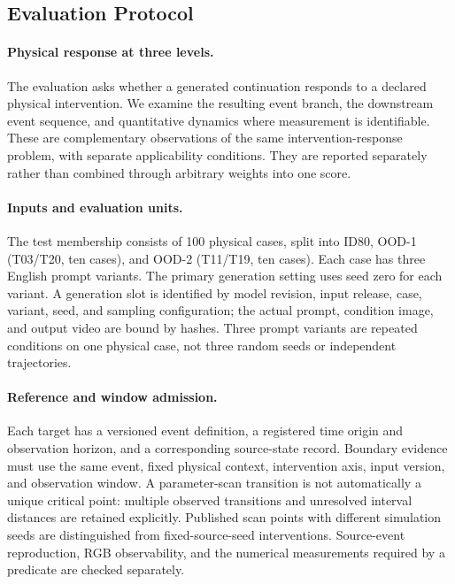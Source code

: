 
\subsection{Evaluation Protocol}
\label{sec:evaluation_protocol}

\paragraph{Physical response at three levels.}
The evaluation asks whether a generated continuation responds to a declared
physical intervention. We examine the resulting event branch, the downstream
event sequence, and quantitative dynamics where measurement is identifiable.
These are complementary observations of the same intervention-response
problem, with separate applicability conditions. They are reported
separately rather than combined through arbitrary weights into one score.

\paragraph{Inputs and evaluation units.}
The test membership consists of 100 physical cases, split into ID80,
OOD-1 (T03/T20, ten cases), and OOD-2 (T11/T19, ten cases). Each case has three
English prompt variants. The primary generation setting uses seed zero for
each variant. A generation slot is identified by model revision, input
release, case, variant, seed, and sampling configuration; the actual prompt,
condition image, and output video are bound by hashes. Three prompt variants
are repeated conditions on one physical case, not three random seeds or
independent trajectories.

\paragraph{Reference and window admission.}
Each target has a versioned event definition, a registered time origin and
observation horizon, and a corresponding source-state record. Boundary
evidence must use the same event, fixed physical context, intervention axis,
input version, and observation window. A parameter-scan transition is not
automatically a unique critical point: multiple observed transitions and
unresolved interval distances are retained explicitly. Published scan points
with different simulation seeds are distinguished from fixed-source-seed
interventions. Source-event reproduction, RGB observability, and the
numerical measurements required by a predicate are checked separately.

